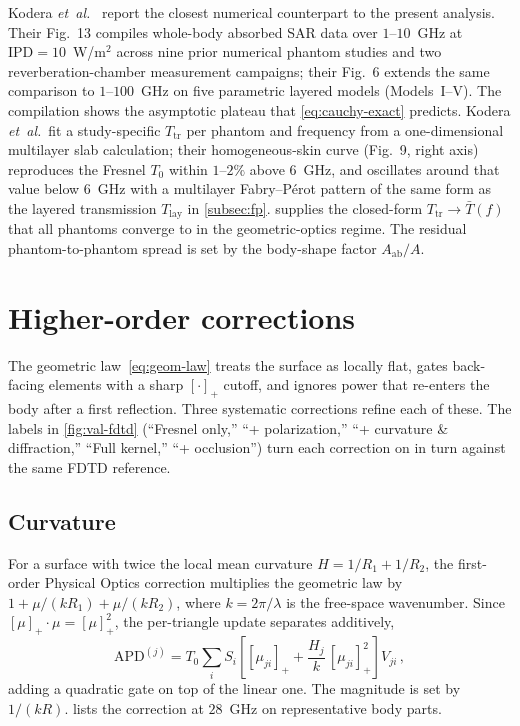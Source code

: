 \documentclass[journal,twocolumn,10pt]{IEEEtran}
\theoremstyle{plain}
\theoremstyle{remark}
\newcommand{\IPD}{\mathrm{IPD}}
\newcommand{\APD}{\mathrm{APD}}
\newcommand{\Aab}{A_{\mathrm{ab}}}
\newcommand{\Tbar}{\bar{T}}
\newcommand{\Tlay}{T_{\mathrm{lay}}}
\newcommand{\pospart}[1]{\left[#1\right]_{+}}
\begin{document}
Kodera \textit{et~al.}~\cite{Kodera2024} report the closest numerical
counterpart to the present analysis. Their Fig.~13 compiles
whole-body absorbed SAR data over $1$--$10$~GHz at
$\IPD = 10$~W/m$^2$ across nine prior numerical phantom studies and
two reverberation-chamber measurement campaigns; their Fig.~6
extends the same comparison to $1$--$100$~GHz on five parametric
layered models (Models~I--V). The compilation shows the asymptotic
plateau that \eqref{eq:cauchy-exact} predicts. Kodera
\textit{et~al.}\ fit a study-specific $T_{\mathrm{tr}}$ per phantom
and frequency from a one-dimensional multilayer slab calculation;
their homogeneous-skin curve (Fig.~9, right axis) reproduces the
Fresnel $T_0$ within $1$--$2\%$ above $6$~GHz, and oscillates around
that value below $6$~GHz with a multilayer Fabry--P\'erot pattern of
the same form as the layered transmission $\Tlay$ in
\cref{subsec:fp}.  supplies the closed-form
$T_{\mathrm{tr}} \to \Tbar(f)$ that all phantoms converge to in the
geometric-optics regime. The residual phantom-to-phantom spread is
set by the body-shape factor $\Aab/A$.


\section{Higher-order corrections}\label{sec:corrections}

The geometric law~\eqref{eq:geom-law} treats the surface as locally
flat, gates back-facing elements with a sharp $[\cdot]_+$ cutoff, and
ignores power that re-enters the body after a first reflection.
Three systematic corrections refine each of these. The labels in
\cref{fig:val-fdtd} (``Fresnel only,'' ``+ polarization,'' ``+
curvature \& diffraction,'' ``Full kernel,'' ``+ occlusion'') turn
each correction on in turn against the same FDTD reference.

\subsection{Curvature}\label{subsec:corr-curv}
For a surface with twice the local mean curvature $H = 1/R_1 +
1/R_2$, the first-order Physical Optics correction multiplies the
geometric law by $1 + \mu/(kR_1) + \mu/(kR_2)$, where
$k = 2\pi/\lambda$ is the free-space wavenumber. Since
$\pospart{\mu}\cdot\mu = \pospart{\mu}^2$, the per-triangle update
separates additively,
\begin{equation}\label{eq:curv-update}
  \APD^{(j)} = T_0 \sum_i S_i\!\left[
  \pospart{\mu_{ji}} + \frac{H_j}{k}\,\pospart{\mu_{ji}}^2 \right]
  V_{ji}\, ,
\end{equation}
adding a quadratic gate on top of the linear one. The magnitude is
set by $1/(kR)$.  lists the correction at
$28$~GHz on representative body parts.
\end{document}
